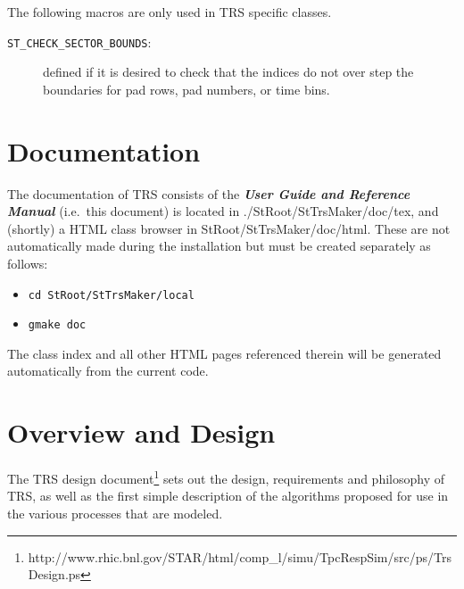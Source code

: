 \documentclass[twoside]{article}
\newcommand{\name}[1]{\textsf{#1}}%
\newcommand{\comp}[1]{\texttt{#1}}%
\begin{document}
The following macros are only used in TRS specific classes.

\begin{description}
  \item[\comp{ST\_CHECK\_SECTOR\_BOUNDS}:] defined if it is desired to
    check that the indices do not over step the boundaries for pad rows,
    pad numbers, or time bins.
\end{description}


\section{Documentation}   

The documentation of \name{TRS} consists of the {\em \bf User Guide and
    Reference Manual} (i.e.~this document) is 
located in \name{./StRoot/StTrsMaker/doc/tex}, and (shortly) 
a \name{HTML} class browser in
\name{StRoot/StTrsMaker/doc/html}.
These are not automatically made during the
installation but must be created separately as follows:
\begin{itemize}
  \item \comp{cd StRoot/StTrsMaker/local}
  \item \comp{gmake doc}
\end{itemize}

The class index and all other \name{HTML} pages referenced therein 
will be generated automatically from the current code. 

\section{Overview and Design}  
\label{sec:design}

The \name{TRS} design document\footnote{http://www.rhic.bnl.gov/STAR/html/comp\_l/simu/TpcRespSim/src/ps/TrsDesign.ps} 
sets out the design, requirements and philosophy of \name{TRS}, as well as
the first simple description of the algorithms proposed for use in
the various processes that are modeled.
\end{document}
